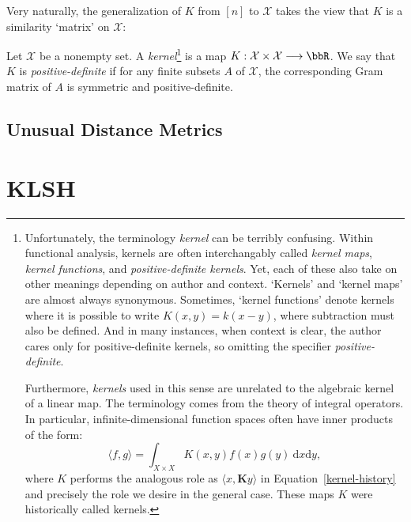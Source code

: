 \documentclass[twoside,11pt]{homework}
\renewcommand{\to}{\longrightarrow}
\begin{document}
Very naturally, the generalization of $K$ from $[n]$ to $\mathcal{X}$ takes the view that $K$ is a similarity `matrix' on $\mathcal{X}$:
\begin{definition} Let $\mathcal{X}$ be a nonempty set. A \emph{kernel}\footnote{Unfortunately, the terminology \emph{kernel} can be terribly confusing. Within functional analysis, kernels are often interchangably called \emph{kernel maps}, \emph{kernel functions}, and \emph{positive-definite kernels}. Yet, each of these also take on other meanings depending on author and context. `Kernels' and `kernel maps' are almost always synonymous. Sometimes, `kernel functions' denote kernels where it is possible to write $K(x,y) = k(x-y)$, where subtraction must also be defined. And in many instances, when context is clear, the author cares only for positive-definite kernels, so omitting the specifier \emph{positive-definite}.

    Furthermore, \emph{kernels} used in this sense are unrelated to the algebraic kernel of a linear map. The terminology comes from the theory of integral operators. In particular, infinite-dimensional function spaces often have inner products of the form:
    \[\langle f, g\rangle = \int_{X \times X} K(x,y) f(x) g(y) \ \mathrm{d}x \mathrm{d}y,\]
    where $K$ performs the analogous role as $\langle x, \mathbf{K}y\rangle$ in Equation~\ref{kernel-history} and precisely the role we desire in the general case. These maps $K$ were historically called kernels.
  } is a map $K : \mathcal{X} \times \mathcal{X} \to \bbR$. We say that $K$ is \emph{positive-definite} if for any finite subsets $A$ of $\mathcal{X}$, the corresponding Gram matrix of $A$ is symmetric and positive-definite.
\end{definition}

















\subsection{Unusual Distance Metrics} %

\section{KLSH}
\end{document}
